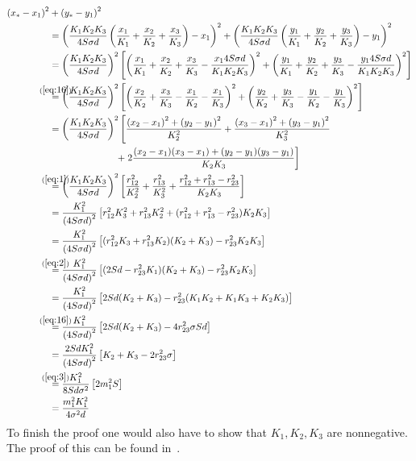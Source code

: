 \begin{align}
  {(x_\ast - x_1)}^2
  &+ {(y_\ast - y_1)}^2 \\
  &= {\left( \frac{K_1 K_2 K_3}{4 S \sigma d} \left( \frac{x_1}{K_1} +
    \frac{x_2}{K_2} + \frac{x_3}{K_3} \right) - x_1 \right)}^2 +
    {\left( \frac{K_1 K_2 K_3}{4 S \sigma d} \left( \frac{y_1}{K_1} +
    \frac{y_2}{K_2} + \frac{y_3}{K_3} \right) - y_1 \right)}^2 \\
  &= {\left( \frac{K_1 K_2 K_3}{4 S \sigma d} \right)}^2 \left[{\left(
    \frac{x_1}{K_1} + \frac{x_2}{K_2} + \frac{x_3}{K_3} -
    \frac{x_1 4 S \sigma d}{K_1 K_2 K_3} \right)}^2 + {\left(
    \frac{y_1}{K_1} + \frac{y_2}{K_2} + \frac{y_3}{K_3} -
    \frac{y_1 4 S \sigma d}{K_1 K_2 K_3} \right)}^2 \right] \\
  &\stackrel{\mathclap{(\ref{eq:16})}}{=}
    {\left( \frac{K_1 K_2 K_3}{4 S \sigma d} \right)}^2
    \left[ {\left( \frac{x_2}{K_2} + \frac{x_3}{K_3} - \frac{x_1}{K_2} -
    \frac{x_1}{K_3} \right)}^2 + {\left( \frac{y_2}{K_2} + \frac{y_3}{K_3} -
    \frac{y_1}{K_2} - \frac{y_1}{K_3} \right)}^2 \right] \\
  &= {\left( \frac{K_1 K_2 K_3}{4 S \sigma d} \right)}^2
    \left[ \frac{{(x_2 - x_1)}^2 + {(y_2 - y_1)}^2}{K_2^2} +
    \frac{{(x_3 - x_1)}^2 + {(y_3 - y_1)}^2}{K_3^2} \right. \\
  &\hspace{7em} \left. + \; 2 \frac{(x_2 - x_1)(x_3 - x_1) +
    (y_2 - y_1)(y_3 - y_1)}{K_2 K_3} \right] \\
  &\stackrel{\mathclap{(\ref{eq:1})}}{=}
    {\left( \frac{K_1 K_2 K_3}{4 S \sigma d} \right)}^2
    \left[ \frac{r_{12}^2}{K_2^2} + \frac{r_{13}^2}{K_3^2} +
    \frac{r_{12}^2 + r_{13}^2 - r_{23}^2}{K_2 K_3} \right] \\
  &= \frac{K_1^2}{{(4 S \sigma d)}^2}
    \left[ r_{12}^2 K_3^2 + r_{13}^2 K_2^2 +
    (r_{12}^2 + r_{13}^2 - r_{23}^2) K_2 K_3 \right] \\
  &= \frac{K_1^2}{{(4 S \sigma d)}^2}
    \left[ (r_{12}^2 K_3 + r_{13}^2 K_2) (K_2 + K_3) -
    r_{23}^2 K_2 K_3 \right] \\
  &\stackrel{\mathclap{(\ref{eq:2})}}{=}
    \frac{K_1^2}{{(4 S \sigma d)}^2}
    \left[ (2 S d - r_{23}^2 K_1) (K_2 + K_3) - r_{23}^2 K_2 K_3 \right] \\
  &= \frac{K_1^2}{{(4 S \sigma d)}^2}
    \left[ 2 S d (K_2 + K_3) - r_{23}^2 (K_1 K_2 + K_1 K_3 + K_2 K_3) \right] \\
  &\stackrel{\mathclap{(\ref{eq:16})}}{=}
    \frac{K_1^2}{{(4 S \sigma d)}^2}
    \left[ 2 S d (K_2 + K_3) - 4 r_{23}^2 \sigma S d \right] \\
  &= \frac{2 S d K_1^2}{{(4 S \sigma d)}^2}
    \left[ K_2 + K_3 - 2 r_{23}^2 \sigma \right] \\
  &\stackrel{\mathclap{(\ref{eq:3})}}{=}
    \frac{K_1^2}{8 S d \sigma^2}
    \left[ 2 m_1^2 S \right] \\
  &= \frac{m_1^2 K_1^2}{4 \sigma^2 d}
\end{align}
%
To finish the proof one would also have to show that $K_1, K_2, K_3$ are
nonnegative. The proof of this can be found in~\cite[p.~5-6]{uteshev2014}.

